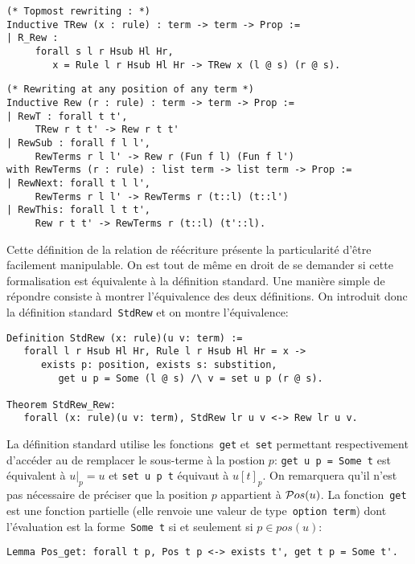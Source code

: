 \begin{lstlisting}
(* Topmost rewriting : *)
Inductive TRew (x : rule) : term -> term -> Prop :=
| R_Rew :
     forall s l r Hsub Hl Hr,
        x = Rule l r Hsub Hl Hr -> TRew x (l @ s) (r @ s).
\end{lstlisting}


\begin{lstlisting}
(* Rewriting at any position of any term *)
Inductive Rew (r : rule) : term -> term -> Prop :=
| RewT : forall t t', 
     TRew r t t' -> Rew r t t'
| RewSub : forall f l l', 
     RewTerms r l l' -> Rew r (Fun f l) (Fun f l')
with RewTerms (r : rule) : list term -> list term -> Prop :=
| RewNext: forall t l l',
     RewTerms r l l' -> RewTerms r (t::l) (t::l')
| RewThis: forall l t t',
     Rew r t t' -> RewTerms r (t::l) (t'::l).
\end{lstlisting}



Cette définition de la relation de réécriture présente la particularité
d'être facilement manipulable. On est tout de même en droit de se demander si cette
formalisation est équivalente à la définition standard. Une manière simple de répondre
consiste à montrer l'équivalence des deux définitions. On introduit donc la définition standard~\lstinline!StdRew!
et on montre l'équivalence:

\begin{lstlisting}
Definition StdRew (x: rule)(u v: term) := 
   forall l r Hsub Hl Hr, Rule l r Hsub Hl Hr = x ->
      exists p: position, exists s: substition, 
         get u p = Some (l @ s) /\ v = set u p (r @ s).

Theorem StdRew_Rew:
   forall (x: rule)(u v: term), StdRew lr u v <-> Rew lr u v.
\end{lstlisting}

La définition standard utilise les fonctions~\lstinline!get! et~\lstinline!set!
permettant respectivement d'accéder au de remplacer le sous-terme à la postion $p$:
\lstinline!get u p = Some t! est équivalent à $u|_p = u$ et \lstinline!set u p t! équivaut à $u[t]_p$.
On remarquera qu'il n'est pas nécessaire de préciser que la position $p$ appartient à $\mathcal{ P}os(u)$.
La fonction~\lstinline!get! est une fonction partielle (elle renvoie une valeur de type~\lstinline!option term!)
dont l'évaluation est la forme~\lstinline!Some t! si et seulement si $p \in pos(u)$:
\begin{lstlisting}
Lemma Pos_get: forall t p, Pos t p <-> exists t', get t p = Some t'.
\end{lstlisting}


